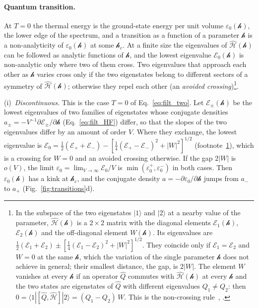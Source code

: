 \documentclass[10pt,a4paper]{article}
\theoremstyle{plain}
\newcommand{\hfield}{\mathscr{h}}  %
\newcommand{\enrg}{\mathcal{E}}  %
\begin{document}
\paragraph{Quantum transition.} At $T=0$ the thermal energy is the
ground-state energy per unit volume $\varepsilon_0(\hfield)$, the lower edge
of the spectrum, and a transition as a function of a parameter $\hfield$ is
a non-analyticity of $\varepsilon_0(\hfield)$ at some $\hfield_c$. At a finite
size the eigenvalues of $\hat{\mathcal H}(\hfield)$ can be followed as
analytic functions of $\hfield$, and the lowest eigenvalue
$\enrg_0(\hfield)$ is non-analytic only where two of them cross. Two
eigenvalues that approach each other as $\hfield$ varies cross only if the
two eigenstates belong to different sectors of a symmetry of
$\hat{\mathcal H}(\hfield)$; otherwise they repel each other (an
\emph{avoided crossing})\footnote{\label{fn:crossing}In the subspace of the
two eigenstates $|1\rangle$ and $|2\rangle$ at a nearby value of the
parameter, $\hat{\mathcal H}(\hfield)$ is a $2\times2$ matrix with the
diagonal elements $\enrg_1(\hfield)$, $\enrg_2(\hfield)$ and the
off-diagonal element $W(\hfield)$. Its eigenvalues are
$\tfrac12(\enrg_1+\enrg_2)\pm[\tfrac14(\enrg_1-\enrg_2)^{2}+|W|^{2}]^{1/2}$.
They coincide only if $\enrg_1=\enrg_2$ and $W=0$ at the same $\hfield$,
which the variation of the single parameter $\hfield$ does not achieve in
general; their smallest distance, the gap, is $2|W|$. The element $W$
vanishes at every $\hfield$ if an operator $\hat Q$ commutes with
$\hat{\mathcal H}(\hfield)$ at every $\hfield$ and the two states are
eigenstates of $\hat Q$ with different eigenvalues $Q_1\neq Q_2$: then
$0=\langle1|[\hat Q,\hat{\mathcal H}]|2\rangle=(Q_1-Q_2)\,W$. This is the
non-crossing rule~\cite{vonNeumannWigner1929}, \cite[\S79]{LandauLifshitz3}.}.

(i)~\emph{Discontinuous.} This is the case $T=0$ of
Eq.~\eqref{eq:filt_two}. Let $\enrg_\pm(\hfield)$ be the lowest eigenvalues of
two families of eigenstates whose conjugate densities
$a_\pm=-V^{-1}\partial\enrg_\pm/\partial\hfield$ (Eq.~\eqref{eq:filt_HF})
differ, so that the slopes of the two eigenvalues differ by an amount of
order $V$. Where they exchange, the lowest eigenvalue is
$\enrg_0=\tfrac12(\enrg_++\enrg_-)-[\tfrac14(\enrg_+-\enrg_-)^{2}+|W|^{2}]^{1/2}$
(footnote~\ref{fn:crossing}), which is a crossing for $W=0$ and an avoided
crossing otherwise. If the gap $2|W|$ is $o(V)$, the limit
$\varepsilon_0=\lim_{V\to\infty}\enrg_0/V$ is
$\min(\varepsilon_0^{+},\varepsilon_0^{-})$ in both cases. Then
$\varepsilon_0(\hfield)$ has a kink at $\hfield_c$, and the conjugate density
$a=-\partial\varepsilon_0/\partial\hfield$ jumps from $a_-$ to $a_+$
(Fig.~\ref{fig:transitions}d).
\end{document}
